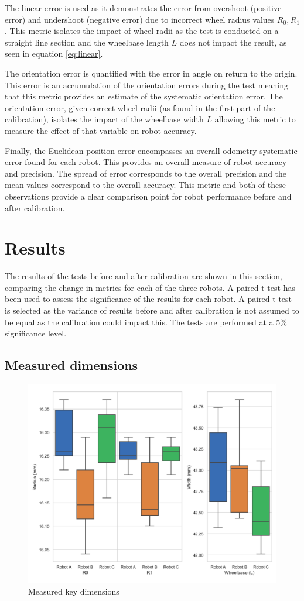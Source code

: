 \documentclass[conference]{IEEEtran}
\begin{document}
The linear error is used as it demonstrates the error from overshoot (positive error) and undershoot (negative error) due to incorrect wheel radius values $R_0, R_1$. This metric isolates the impact of wheel radii as the test is conducted on a straight line section and the wheelbase length $L$ does not impact the result, as seen in equation \ref{eq:linear}.

The orientation error is quantified with the error in angle on return to the origin. This error is an accumulation of the orientation errors during the test meaning that this metric provides an estimate of the systematic orientation error.
The orientation error, given correct wheel radii (as found in the first part of the calibration), isolates the impact of the wheelbase width $L$ allowing this metric to measure the effect of that variable on robot accuracy.

Finally, the Euclidean position error encompasses an overall odometry systematic error found for each robot. This provides an overall measure of robot accuracy and precision. The spread of error corresponds to the overall precision and the mean values correspond to the overall accuracy. 
This metric and both of these observations provide a clear comparison point for robot performance before and after calibration.


\section{Results}\label{sec:results}


The results of the tests before and after calibration are shown in this section, comparing the change in metrics for each of the three robots. 
A paired t-test has been used to assess the significance of the results for each robot. A paired t-test is selected as the variance of results before and after calibration is not assumed to be equal as the calibration could impact this. The tests are performed at a 5\% significance level.

\subsection{Measured dimensions}
\begin{figure}[h]
    \centering
    \includegraphics[width=.5\textwidth]{img/r0r1l.png}
    \caption{Measured key dimensions}
    \label{fig:r0r1L}
\end{figure}
\end{document}
